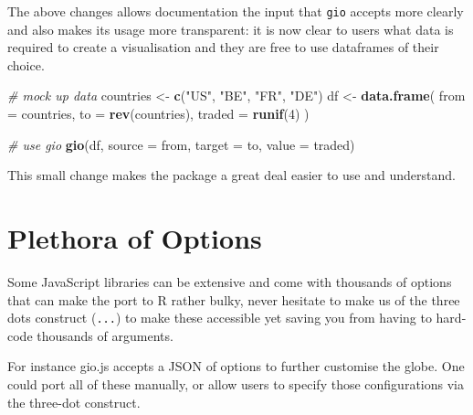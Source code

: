 \documentclass[
]{krantz}
\makeatletter
\newenvironment{Shaded}{\begin{snugshade}}{\end{snugshade}}
\newcommand{\CommentTok}[1]{\textcolor[rgb]{0.37,0.37,0.37}{\textit{#1}}}
\newcommand{\DataTypeTok}[1]{\textcolor[rgb]{0.27,0.27,0.27}{#1}}
\newcommand{\DecValTok}[1]{\textcolor[rgb]{0.06,0.06,0.06}{#1}}
\newcommand{\KeywordTok}[1]{\textcolor[rgb]{0.27,0.27,0.27}{\textbf{#1}}}
\newcommand{\NormalTok}[1]{#1}
\newcommand{\StringTok}[1]{\textcolor[rgb]{0.5,0.5,0.5}{#1}}
\newenvironment{kframe}{%
\medskip{}
\setlength{\fboxsep}{.8em}
 \def\at@end@of@kframe{}%
 \ifinner\ifhmode%
  \def\at@end@of@kframe{\end{minipage}}%
  \begin{minipage}{\columnwidth}%
 \fi\fi%
 \def\FrameCommand##1{\hskip\@totalleftmargin \hskip-\fboxsep
 \colorbox{shadecolor}{##1}\hskip-\fboxsep
     \hskip-\linewidth \hskip-\@totalleftmargin \hskip\columnwidth}%
 \MakeFramed {\advance\hsize-\width
   \@totalleftmargin\z@ \linewidth\hsize
   \@setminipage}}%
 {\par\unskip\endMakeFramed%
 \at@end@of@kframe}
\renewenvironment{Shaded}{\begin{kframe}}{\end{kframe}}
\makeatother
\begin{document}
The above changes allows documentation the input that \texttt{gio} accepts more clearly and also makes its usage more transparent: it is now clear to users what data is required to create a visualisation and they are free to use dataframes of their choice.

\begin{Shaded}
\begin{Highlighting}[]
\CommentTok{\# mock up data}
\NormalTok{countries \textless{}{-}}\StringTok{ }\KeywordTok{c}\NormalTok{(}\StringTok{"US"}\NormalTok{, }\StringTok{"BE"}\NormalTok{, }\StringTok{"FR"}\NormalTok{, }\StringTok{"DE"}\NormalTok{)}
\NormalTok{df \textless{}{-}}\StringTok{ }\KeywordTok{data.frame}\NormalTok{(}
  \DataTypeTok{from =}\NormalTok{ countries,}
  \DataTypeTok{to =} \KeywordTok{rev}\NormalTok{(countries),}
  \DataTypeTok{traded =} \KeywordTok{runif}\NormalTok{(}\DecValTok{4}\NormalTok{)}
\NormalTok{)}

\CommentTok{\# use gio}
\KeywordTok{gio}\NormalTok{(df, }\DataTypeTok{source =}\NormalTok{ from, }\DataTypeTok{target =}\NormalTok{ to, }\DataTypeTok{value =}\NormalTok{ traded)}
\end{Highlighting}
\end{Shaded}

This small change makes the package a great deal easier to use and understand.

\hypertarget{widgets-final-options}{%
\section{Plethora of Options}\label{widgets-final-options}}

Some JavaScript libraries can be extensive and come with thousands of options that can make the port to R rather bulky, never hesitate to make us of the three dots construct (\texttt{...}) to make these accessible yet saving you from having to hard-code thousands of arguments.

For instance gio.js accepts a JSON of options to further customise the globe. One could port all of these manually, or allow users to specify those configurations via the three-dot construct.
\end{document}

